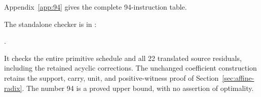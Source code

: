 Appendix~\ref{app:94} gives the complete 94-instruction table.

The standalone checker is in :
\begin{center}
\small{}.
\end{center}
It checks the entire primitive schedule and all 22 translated
source residuals, including the retained acyclic corrections.
The unchanged coefficient construction retains the support,
carry, unit, and positive-witness proof of
Section~\ref{sec:affine-radix}. The number 94 is a proved upper
bound, with no assertion of optimality.
